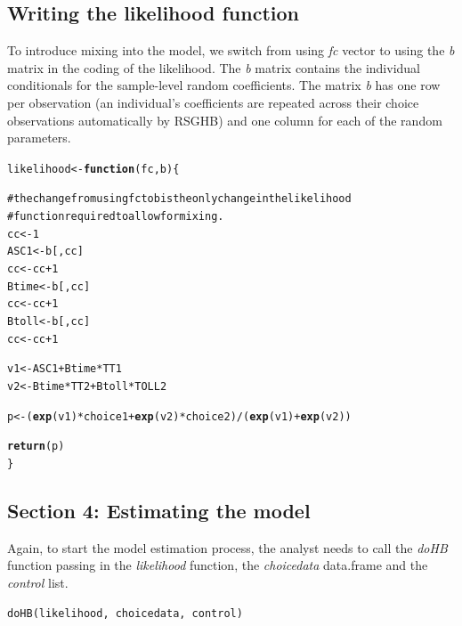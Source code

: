 \documentclass{article}\usepackage{graphicx, color}
\makeatletter
\newcommand{\hlfunctioncall}[1]{\textcolor[rgb]{0.501960784313725,0,0.329411764705882}{\textbf{#1}}}%
\newcommand{\hlcomment}[1]{\textcolor[rgb]{0.180392156862745,0.6,0.341176470588235}{#1}}%
\newenvironment{kframe}{%
 \def\at@end@of@kframe{}%
 \ifinner\ifhmode%
  \def\at@end@of@kframe{\end{minipage}}%
  \begin{minipage}{\columnwidth}%
 \fi\fi%
 \def\FrameCommand##1{\hskip\@totalleftmargin \hskip-\fboxsep
 \colorbox{shadecolor}{##1}\hskip-\fboxsep
     \hskip-\linewidth \hskip-\@totalleftmargin \hskip\columnwidth}%
 \MakeFramed {\advance\hsize-\width
   \@totalleftmargin\z@ \linewidth\hsize
   \@setminipage}}%
 {\par\unskip\endMakeFramed%
 \at@end@of@kframe}
\newenvironment{knitrout}{}{} %
\makeatother
\begin{document}
\subsection*{Writing the likelihood function}

To introduce mixing into the model, we switch from using \emph{fc} vector to using the \emph{b} matrix in the coding of the likelihood. The \emph{b} matrix contains the individual conditionals for the sample-level random coefficients. The matrix \emph{b} has one row per observation (an individual's coefficients are repeated across their choice observations automatically by RSGHB) and one column for each of the random parameters.

\begin{knitrout}
\color{fgcolor}\begin{kframe}
\begin{alltt}

likelihood <- \hlfunctioncall{function}(fc, b) \{
    
\hlcomment{    # the change from using fc to b is the only change in the likelihood}
\hlcomment{    # function required to allow for mixing.}
    cc <- 1
    ASC1 <- b[, cc]
    cc <- cc + 1
    Btime <- b[, cc]
    cc <- cc + 1
    Btoll <- b[, cc]
    cc <- cc + 1
    
    v1 <- ASC1 + Btime * TT1
    v2 <- Btime * TT2 + Btoll * TOLL2
    
    p <- (\hlfunctioncall{exp}(v1) * choice1 + \hlfunctioncall{exp}(v2) * choice2)/(\hlfunctioncall{exp}(v1) + \hlfunctioncall{exp}(v2))
    
    \hlfunctioncall{return}(p)
\}
\end{alltt}
\end{kframe}
\end{knitrout}


\subsection*{Section 4: Estimating the model}

Again, to start the model estimation process, the analyst needs to call the \emph{doHB} function passing in the \emph{likelihood} function, the \emph{choicedata} data.frame and the \emph{control} list. 

\begin{verbatim}
doHB(likelihood, choicedata, control)
\end{verbatim}
\end{document}
